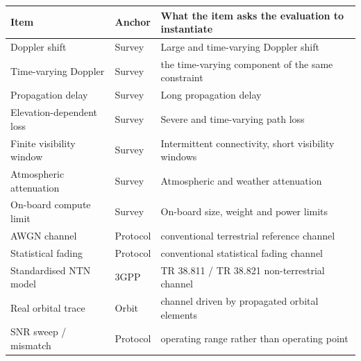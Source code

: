 \begin{tabular}{llp{62mm}}
\toprule
Item & Anchor & What the item asks the evaluation to instantiate \\
\midrule
Doppler shift & Survey & Large and time-varying Doppler shift \\
Time-varying Doppler & Survey & the time-varying component of the same constraint \\
Propagation delay & Survey & Long propagation delay \\
Elevation-dependent loss & Survey & Severe and time-varying path loss \\
Finite visibility window & Survey & Intermittent connectivity, short visibility windows \\
Atmospheric attenuation & Survey & Atmospheric and weather attenuation \\
On-board compute limit & Survey & On-board size, weight and power limits \\
AWGN channel & Protocol & conventional terrestrial reference channel \\
Statistical fading & Protocol & conventional statistical fading channel \\
Standardised NTN model & 3GPP & TR 38.811 / TR 38.821 non-terrestrial channel \\
Real orbital trace & Orbit & channel driven by propagated orbital elements \\
SNR sweep / mismatch & Protocol & operating range rather than operating point \\
\bottomrule
\end{tabular}
